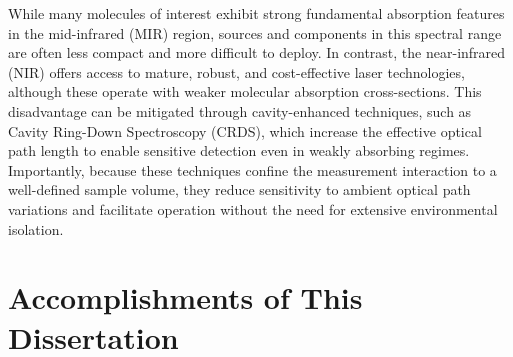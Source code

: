 \documentclass[12pt]{report}
\begin{document}
	While many molecules of interest exhibit strong fundamental absorption features in the mid-infrared (MIR) region, sources and components in this spectral range are often less compact and more difficult to deploy. In contrast, the near-infrared (NIR) offers access to mature, robust, and cost-effective laser technologies, although these operate with weaker molecular absorption cross-sections. This disadvantage can be mitigated through cavity-enhanced techniques, such as Cavity Ring-Down Spectroscopy (CRDS), which increase the effective optical path length to enable sensitive detection even in weakly absorbing regimes. Importantly, because these techniques confine the measurement interaction to a well-defined sample volume, they reduce sensitivity to ambient optical path variations and facilitate operation without the need for extensive environmental isolation.
	
	\section{Accomplishments of This Dissertation}
	
\end{document}
